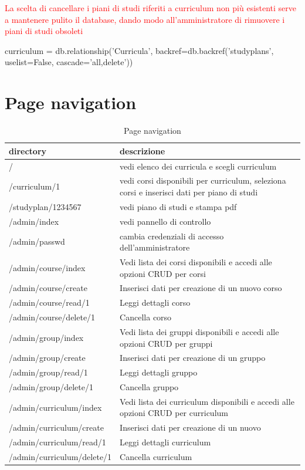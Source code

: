 \documentclass{article}
\begin{document}
\textcolor{red}{La scelta di cancellare i piani di studi riferiti a curriculum non più esistenti serve a mantenere pulito il database, dando modo all'amministratore di rimuovere i piani di studi obsoleti }
\begin{python}
 curriculum = db.relationship('Curricula', backref=db.backref('studyplans', uselist=False,  cascade='all,delete'))
\end{python}

\section{Page navigation}
\begin{table}[!h]
  \begin{center}
    \caption{Page navigation}
    \label{tab:Page navigation}
    \begin{tabular}{l|l} %
      \textbf{directory} & \textbf{descrizione}  \\ 
      \hline
		/ & vedi elenco dei curricula e scegli curriculum\\
		/curriculum/1 & vedi corsi disponibili per curriculum, seleziona corsi e  inserisci dati per piano di studi\\
		/studyplan/1234567  & vedi piano di studi e stampa pdf \\
		/admin/index & vedi pannello di controllo \\
		/admin/passwd  & cambia credenziali di accesso dell'amministratore\\
		/admin/course/index & Vedi lista dei corsi disponibili e accedi alle opzioni CRUD per corsi \\
		/admin/course/create & Inserisci dati per creazione di un nuovo corso \\
		/admin/course/read/1 & Leggi dettagli corso \\
		/admin/course/delete/1 & Cancella corso \\
		/admin/group/index & Vedi lista dei gruppi disponibili e accedi alle opzioni CRUD per gruppi \\
		/admin/group/create &  Inserisci dati per creazione di un gruppo \\
		/admin/group/read/1 & Leggi dettagli gruppo \\
		/admin/group/delete/1 & Cancella gruppo \\
		/admin/curriculum/index & Vedi lista dei curriculum disponibili e accedi alle opzioni CRUD per curriculum \\
		/admin/curriculum/create &  Inserisci dati per creazione di un nuovo \\
		/admin/curriculum/read/1 & Leggi dettagli curriculum \\
		/admin/curriculum/delete/1 & Cancella curriculum \\
		
		
    \end{tabular}
  \end{center}
\end{table}
\end{document}
